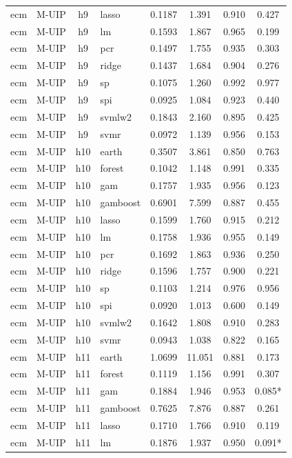 \begin{ThreePartTable}
\begin{longtable}[t]{llclcccc}
ecm & M-UIP & h9 & lasso & 0.1187 & 1.391 & 0.910 & 0.427\\
ecm & M-UIP & h9 & lm & 0.1593 & 1.867 & 0.965 & 0.199\\
ecm & M-UIP & h9 & pcr & 0.1497 & 1.755 & 0.935 & 0.303\\
ecm & M-UIP & h9 & ridge & 0.1437 & 1.684 & 0.904 & 0.276\\
ecm & M-UIP & h9 & sp & 0.1075 & 1.260 & 0.992 & 0.977\\
ecm & M-UIP & h9 & spi & 0.0925 & 1.084 & 0.923 & 0.440\\
ecm & M-UIP & h9 & svmlw2 & 0.1843 & 2.160 & 0.895 & 0.425\\
ecm & M-UIP & h9 & svmr & 0.0972 & 1.139 & 0.956 & 0.153\\
\addlinespace
ecm & M-UIP & h10 & earth & 0.3507 & 3.861 & 0.850 & 0.763\\
ecm & M-UIP & h10 & forest & 0.1042 & 1.148 & 0.991 & 0.335\\
ecm & M-UIP & h10 & gam & 0.1757 & 1.935 & 0.956 & 0.123\\
ecm & M-UIP & h10 & gamboost & 0.6901 & 7.599 & 0.887 & 0.455\\
ecm & M-UIP & h10 & lasso & 0.1599 & 1.760 & 0.915 & 0.212\\
ecm & M-UIP & h10 & lm & 0.1758 & 1.936 & 0.955 & 0.149\\
ecm & M-UIP & h10 & pcr & 0.1692 & 1.863 & 0.936 & 0.250\\
ecm & M-UIP & h10 & ridge & 0.1596 & 1.757 & 0.900 & 0.221\\
ecm & M-UIP & h10 & sp & 0.1103 & 1.214 & 0.976 & 0.956\\
ecm & M-UIP & h10 & spi & 0.0920 & 1.013 & 0.600 & 0.149\\
ecm & M-UIP & h10 & svmlw2 & 0.1642 & 1.808 & 0.910 & 0.283\\
ecm & M-UIP & h10 & svmr & 0.0943 & 1.038 & 0.822 & 0.165\\
\addlinespace
ecm & M-UIP & h11 & earth & 1.0699 & 11.051 & 0.881 & 0.173\\
ecm & M-UIP & h11 & forest & 0.1119 & 1.156 & 0.991 & 0.307\\
ecm & M-UIP & h11 & gam & 0.1884 & 1.946 & 0.953 & 0.085*\\
ecm & M-UIP & h11 & gamboost & 0.7625 & 7.876 & 0.887 & 0.261\\
ecm & M-UIP & h11 & lasso & 0.1710 & 1.766 & 0.910 & 0.119\\
ecm & M-UIP & h11 & lm & 0.1876 & 1.937 & 0.950 & 0.091*\\

\end{longtable}
\end{ThreePartTable}
